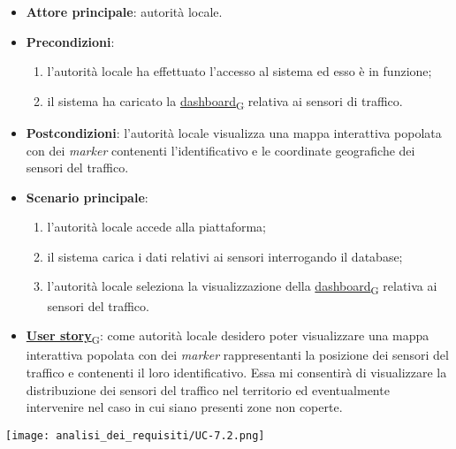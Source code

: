 \begin{itemize}
	\item \textbf{Attore principale}: autorità locale.
	\item \textbf{Precondizioni}:
	      \begin{enumerate}
		      \item l'autorità locale ha effettuato l'accesso al sistema ed esso è in funzione;
		      \item il sistema ha caricato la \href{https://7last.github.io/docs/pb/documentazione-interna/glossario\#dashboard}{dashboard\textsubscript{G}} relativa ai sensori di traffico.
	      \end{enumerate}
	\item \textbf{Postcondizioni}: l'autorità locale visualizza una mappa interattiva popolata con dei \textit{marker} contenenti l'identificativo e le coordinate geografiche dei sensori del traffico.
	\item \textbf{Scenario principale}:
	      \begin{enumerate}
		      \item l'autorità locale accede alla piattaforma;
		      \item il sistema carica i dati relativi ai sensori interrogando il database;
		      \item l'autorità locale seleziona la visualizzazione della \href{https://7last.github.io/docs/pb/documentazione-interna/glossario\#dashboard}{dashboard\textsubscript{G}} relativa ai sensori del traffico.
	      \end{enumerate}
	\item \href{https://7last.github.io/docs/pb/documentazione-interna/glossario\#user-story}{\textbf{User story}\textsubscript{G}}:
	      come autorità locale desidero poter visualizzare una mappa interattiva popolata con dei \textit{marker} rappresentanti la posizione dei sensori del traffico
	      e contenenti il loro identificativo. Essa mi consentirà di visualizzare la distribuzione dei sensori del traffico nel territorio ed eventualmente intervenire nel caso in cui siano presenti zone non coperte.
\end{itemize}
\begin{center}
	\texttt{[image: analisi\_dei\_requisiti/UC-7.2.png]}
\end{center}


